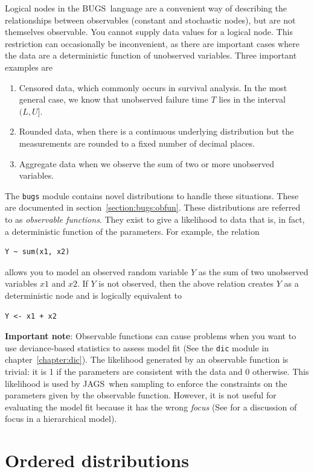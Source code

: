 \documentclass[11pt, a4paper, titlepage]{report}
\newcommand{\JAGS}{\textsf{JAGS}}
\newcommand{\BUGS}{\textsf{BUGS}}
\begin{document}
Logical nodes in the \BUGS\ language are a convenient way of
describing the relationships between observables (constant and
stochastic nodes), but are not themselves observable. You cannot
supply data values for a logical node.  This restriction can
occasionally be inconvenient, as there are important cases where the
data are a deterministic function of unobserved variables.  Three
important examples are
\begin{enumerate}
\item Censored data, which commonly occurs in survival analysis. In
the most general case, we know that unobserved failure time $T$
lies in the interval $(L,U]$.
\item Rounded data, when there is a continuous underlying distribution
but the measurements are rounded to a fixed number of decimal places.
\item Aggregate data when we observe the sum of two or more
unobserved variables.
\end{enumerate}
The \texttt{bugs} module contains novel distributions to handle these
situations. These are documented in section~\ref{section:bugs:obfun}.
These distributions are referred to as {\em observable
  functions}. They exist to give a likelihood to data that is, in
fact, a deterministic function of the parameters.  For example, the
relation
\begin{verbatim}
Y ~ sum(x1, x2)
\end{verbatim}
allows you to model an observed random variable $Y$ as the sum of two
unobserved variables $x1$ and $x2$. If $Y$ is not observed, then the
above relation creates $Y$ as a deterministic node and is logically
equivalent to
\begin{verbatim}
Y <- x1 + x2
\end{verbatim}

{\bf Important note}: Observable functions can cause problems when you
want to use deviance-based statistics to assess model fit (See the
\texttt{dic} module in chapter~\ref{chapter:dic}). The likelihood
generated by an observable function is trivial: it is 1 if the
parameters are consistent with the data and 0 otherwise. This
likelihood is used by \JAGS\ when sampling to enforce the constraints
on the parameters given by the observable function. However, it is not
useful for evaluating the model fit because it has the wrong {\em
  focus} (See \citet{spiegelhalter:etal:2002} for a discussion of
focus in a hierarchical model).

\section{Ordered distributions}
\end{document}
